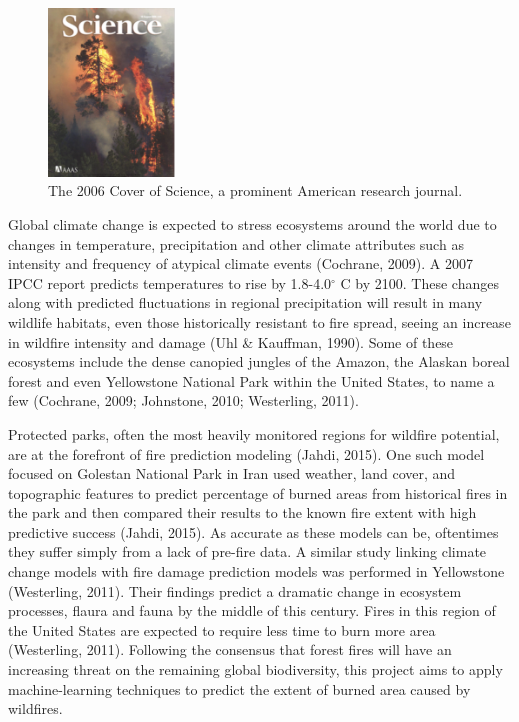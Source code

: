 \documentclass{article}
\begin{document}
\begin{figure}[!ht]
\centering \includegraphics[width=0.3\textwidth]{images/aaas_cover.png}
\caption{The 2006 Cover of Science, a prominent American research journal.}
\end{figure}

Global climate change is expected to stress ecosystems around the world due to changes in temperature, precipitation and other climate attributes such as intensity and frequency of atypical climate events (Cochrane, 2009). A 2007 IPCC report predicts temperatures to rise by 1.8-4.0$^{\circ}$ C by 2100. These changes along with predicted fluctuations in regional precipitation will result in many wildlife habitats, even those historically resistant to fire spread, seeing an increase in wildfire intensity and damage (Uhl \& Kauffman, 1990). Some of these ecosystems include the dense canopied jungles of the Amazon, the Alaskan boreal forest and even Yellowstone National Park within the United States, to name a few (Cochrane, 2009; Johnstone, 2010; Westerling, 2011). 

Protected parks, often the most heavily monitored regions for wildfire potential, are at the forefront of fire prediction modeling (Jahdi, 2015). One such model focused on Golestan National Park in Iran used weather, land cover, and topographic features to predict percentage of burned areas from historical fires in the park and then compared their results to the known fire extent with high predictive success (Jahdi, 2015). As accurate as these models can be, oftentimes they suffer simply from a lack of pre-fire data. A similar study linking climate change models with fire damage prediction models was performed in Yellowstone (Westerling, 2011). Their findings predict a dramatic change in ecosystem processes, flaura and fauna by the middle of this century. Fires in this region of the United States are expected to require less time to burn more area (Westerling, 2011). Following the consensus that forest fires will have an increasing threat on the remaining global biodiversity, this project aims to apply machine-learning techniques to predict the extent of burned area caused by wildfires. 
\end{document}
